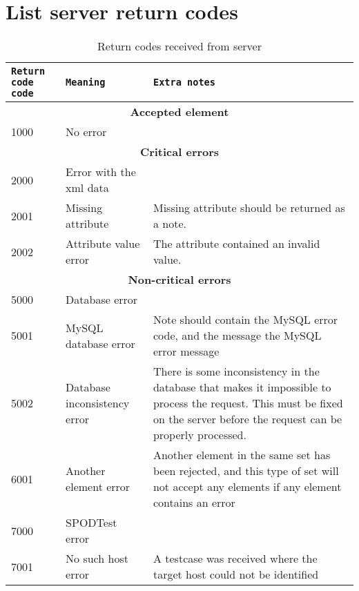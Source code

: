 \newpage
\section{List server return codes}
\label{app:server_return_codes}

\begin{table}[h]
    \centering
    \caption{Return codes received from server}
    \begin{tabular}{|l|l|p{5cm}|}
        \hline
        \texttt{Return code code} & \texttt{Meaning} & \texttt{Extra notes} \\
        \hline
        \hline
        \multicolumn{3}{|c|}{\textbf{Accepted element}} \\
        \hline
        1000 & No error & \\
        \hline
        \hline
        \multicolumn{3}{|c|}{\textbf{Critical errors}} \\
        \hline
        2000 & Error with the \gls{xml} data & \\
        \hline
        2001 & Missing attribute & Missing attribute should be returned as a
        note. \\
        \hline
        2002 & Attribute value error & The attribute contained an invalid
        value. \\
        \hline
        \hline
        \multicolumn{3}{|c|}{\textbf{Non-critical errors}} \\
        \hline
        5000 & Database error & \\
        \hline
        5001 & MySQL database error & Note should contain the MySQL error code, 
        and the message the MySQL error message \\
        \hline
        5002 & Database inconsistency error & There is some inconsistency in
        the database that makes it impossible to process the request. This must
        be fixed on the server before the request can be properly processed. \\
        \hline
        \hline
        6001 & Another element error & Another element in the same set has been
        rejected, and this type of set will not accept any elements if any
        element contains an error\\
        \hline
        \hline
        7000 & SPODTest error & \\
        \hline
        7001 & No such host error & A testcase was received where the target
        host could not be identified \\
        \hline
    \end{tabular}
    \label{tbl:server_return_codes}
\end{table}
